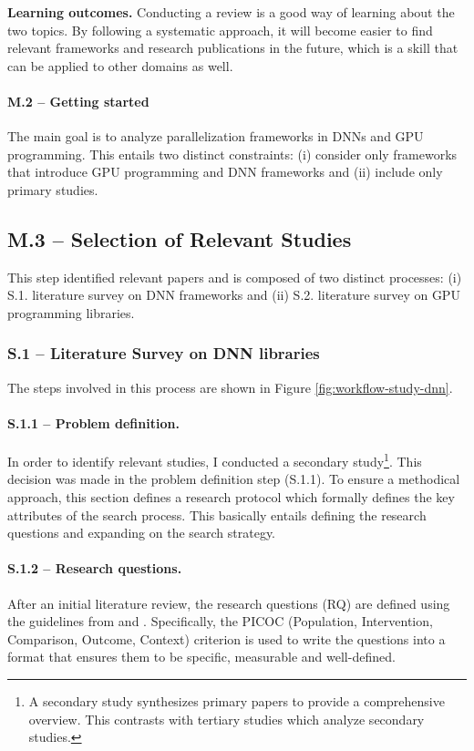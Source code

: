 \textbf{Learning outcomes.}
Conducting a review is a good way of learning about the two topics. By following a systematic approach,
it will become easier to find relevant frameworks and research publications in the future, which is a
skill that can be applied to other domains as well.

\paragraph{M.2 -- Getting started}
\label{sec:research_questions}
The main goal is to analyze parallelization frameworks in DNNs and GPU programming. This entails two distinct
constraints: (i) consider only frameworks that introduce GPU programming and DNN frameworks and (ii) include
only primary studies.

\subsection{M.3 -- Selection of Relevant Studies}
This step identified relevant papers and is composed of two distinct processes: (i) S.1. literature
survey on DNN frameworks and (ii) S.2. literature survey on GPU programming libraries.

\subsubsection{S.1 -- Literature Survey on DNN libraries}
The steps involved in this process are shown in Figure \ref{fig:workflow-study-dnn}.

\paragraph{S.1.1 -- Problem definition.}
In order to identify relevant studies, I conducted a secondary study\footnote{A secondary study
	synthesizes primary papers to provide a comprehensive overview. This contrasts with tertiary
	studies which analyze secondary studies.}. This decision was made in the problem definition step
(S.1.1). To ensure a methodical approach, this section defines a research protocol which formally
defines the key attributes of the search process. This basically entails defining the research
questions and expanding on the search strategy.

\paragraph{S.1.2 -- Research questions.}
After an initial literature review, the research questions (RQ) are defined using the guidelines
from \cite{kitchenham_evidence-based_2015} and \cite{keele_systematic_2007}. Specifically, the
PICOC (Population, Intervention, Comparison, Outcome, Context) criterion is used to write the
questions into a format that ensures them to be specific, measurable and well-defined.


